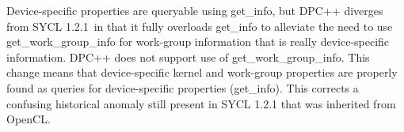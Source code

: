 Device-specific properties are queryable using get\_info, but DPC++ diverges from SYCL 1.2.1 in that it fully overloads get\_info to alleviate the need to use get\_work\_group\_info for work-group information that is really device-specific information. DPC++ does not support use of get\_work\_group\_info. This change means that device-specific kernel and work-group properties are properly found as queries for device-specific properties (get\_info). This corrects a confusing historical anomaly still present in SYCL 1.2.1 that was inherited from OpenCL.\par

















































